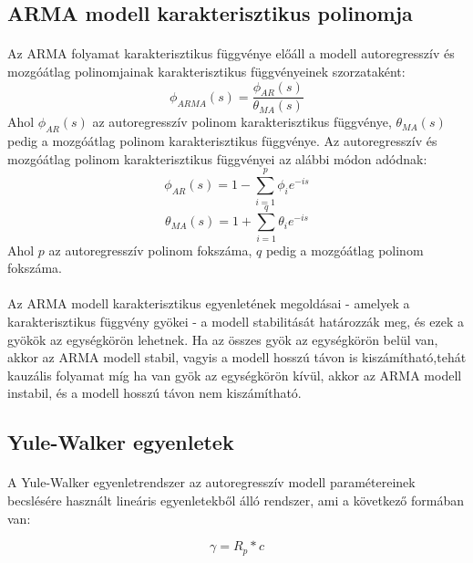 \documentclass[11pt,a4paper]{article}
\begin{document}
				\subsection{ARMA modell karakterisztikus polinomja}
					\paragraph{}
						Az ARMA folyamat karakterisztikus függvénye előáll a modell autoregresszív és mozgóátlag polinomjainak karakterisztikus függvényeinek szorzataként:
						$$\phi_{ARMA}(s) = \frac{\phi_{AR}(s)}{\theta_{MA}(s)}$$
						Ahol $\phi_{AR}(s)$ az autoregresszív polinom karakterisztikus függvénye, $\theta_{MA}(s)$ pedig a mozgóátlag polinom karakterisztikus függvénye. Az autoregresszív és mozgóátlag polinom karakterisztikus függvényei az alábbi módon adódnak:
						$$\phi_{AR}(s) = 1 - \sum_{i=1}^p \phi_i e^{-is}$$
						$$\theta_{MA}(s) = 1 + \sum_{i=1}^q \theta_i e^{-is}$$
						Ahol $p$ az autoregresszív polinom fokszáma, $q$ pedig a mozgóátlag polinom fokszáma.
					\paragraph{}
						Az ARMA modell karakterisztikus egyenletének megoldásai - amelyek a karakterisztikus függvény gyökei - a modell stabilitását határozzák meg, és ezek a gyökök az egységkörön lehetnek. Ha az összes gyök az egységkörön belül van, akkor az ARMA modell stabil, vagyis a modell hosszú távon is kiszámítható,tehát kauzális folyamat míg ha van gyök az egységkörön kívül, akkor az ARMA modell instabil, és a modell hosszú távon nem kiszámítható.
				\subsection{Yule-Walker egyenletek}
					\paragraph{}
						A Yule-Walker egyenletrendszer az autoregresszív modell paramétereinek becslésére használt lineáris egyenletekből álló rendszer, ami a következő formában van:
						
						$$\gamma = R_p * c$$
						
\end{document}
